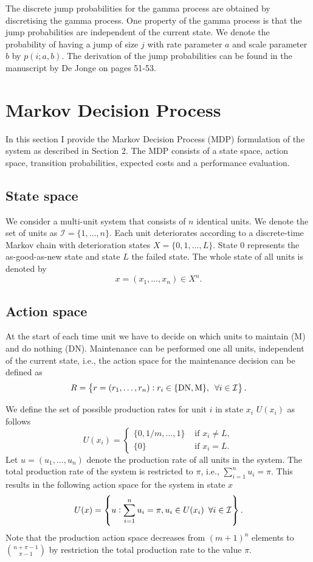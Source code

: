 \documentclass[a4paper,12pt]{article}
\begin{document}
The discrete jump probabilities for the gamma process are obtained by discretising the gamma process. One property of the gamma process is that the jump probabilities are independent of the current state. We denote the probability of having a jump of size $j$ with rate parameter $a$ and scale parameter $b$ by $p(i; a, b)$. The derivation of the jump probabilities can be found in the manuscript by De Jonge on pages 51-53.

\section{Markov Decision Process}
In this section I provide the Markov Decision Process (MDP) formulation of the system as described in Section 2. The MDP consists of a state space, action space, transition probabilities, expected costs and a performance evaluation.

\subsection{State space}
We consider a multi-unit system that consists of $n$ identical units. We denote the set of units as $\mathcal{I} = \{1, \dots, n\}$. Each unit deteriorates according to a discrete-time Markov chain with deterioration states $X = \{0, 1, \dots, L\}$. State $0$ represents the as-good-as-new state and state $L$ the failed state. The whole state of all units is denoted by
$$
x = (x_1, \dots, x_n) \in X^n.
$$

\subsection{Action space}
At the start of each time unit we have to decide on which units to maintain (M) and do nothing (DN). Maintenance can be performed one all units, independent of the current state, i.e., the action space for the maintenance decision can be defined as
$$
R = \left \{r = (r_1, \dots, r_n): r_i \in \{\text{DN}, \text{M}\}, \enskip \forall i \in \mathcal{I} \right \}.
$$

 We define the set of possible production rates for unit $i$ in state $x_i$ $U(x_i)$ as follows
$$
U(x_i) = \begin{cases}
\{0, 1/m, \dots, 1\} & \text{ if } x_i \neq L, \\
\{0\} & \text{ if } x_i = L.
\end{cases}
$$
Let $u = (u_1, \dots, u_n)$ denote the production rate of all units in the system. The total production rate of the system is restricted to $\pi$, i.e., $ \sum_{i=1}^{n}u_i = \pi$. This results in the following action space for the system in state $x$
$$
U(x) = \left\{ u  :  \sum_{i=1}^{n}u_i = \pi, u_i \in U(x_i) \enskip \forall i \in \mathcal{I} \right\}.
$$
Note that the production action space decreases from $(m+1)^n$ elements to ${n + \pi - 1} \choose{\pi - 1} $ by restriction the total production rate to the value $\pi$. 
\end{document}

